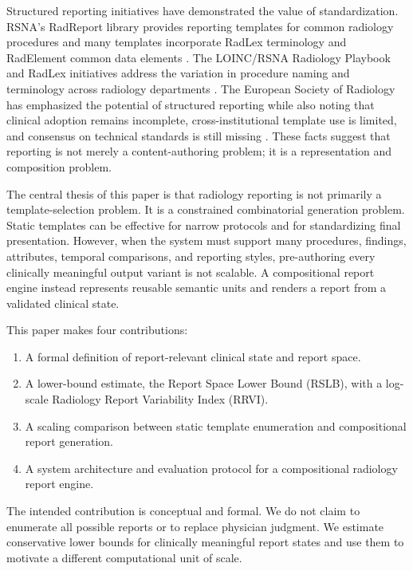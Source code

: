 \documentclass[11pt]{article}
\begin{document}
Structured reporting initiatives have demonstrated the value of standardization. RSNA's RadReport library provides reporting templates for common radiology procedures and many templates incorporate RadLex terminology and RadElement common data elements \cite{RSNARadReport}. The LOINC/RSNA Radiology Playbook and RadLex initiatives address the variation in procedure naming and terminology across radiology departments \cite{LOINCRSNAPlaybook,RSNARadLex}. The European Society of Radiology has emphasized the potential of structured reporting while also noting that clinical adoption remains incomplete, cross-institutional template use is limited, and consensus on technical standards is still missing \cite{ESR2023}. These facts suggest that reporting is not merely a content-authoring problem; it is a representation and composition problem.

The central thesis of this paper is that radiology reporting is not primarily a template-selection problem. It is a constrained combinatorial generation problem. Static templates can be effective for narrow protocols and for standardizing final presentation. However, when the system must support many procedures, findings, attributes, temporal comparisons, and reporting styles, pre-authoring every clinically meaningful output variant is not scalable. A compositional report engine instead represents reusable semantic units and renders a report from a validated clinical state.

This paper makes four contributions:
\begin{enumerate}[leftmargin=*]
    \item A formal definition of report-relevant clinical state and report space.
    \item A lower-bound estimate, the Report Space Lower Bound (RSLB), with a log-scale Radiology Report Variability Index (RRVI).
    \item A scaling comparison between static template enumeration and compositional report generation.
    \item A system architecture and evaluation protocol for a compositional radiology report engine.
\end{enumerate}

The intended contribution is conceptual and formal. We do not claim to enumerate all possible reports or to replace physician judgment. We estimate conservative lower bounds for clinically meaningful report states and use them to motivate a different computational unit of scale.
\end{document}
